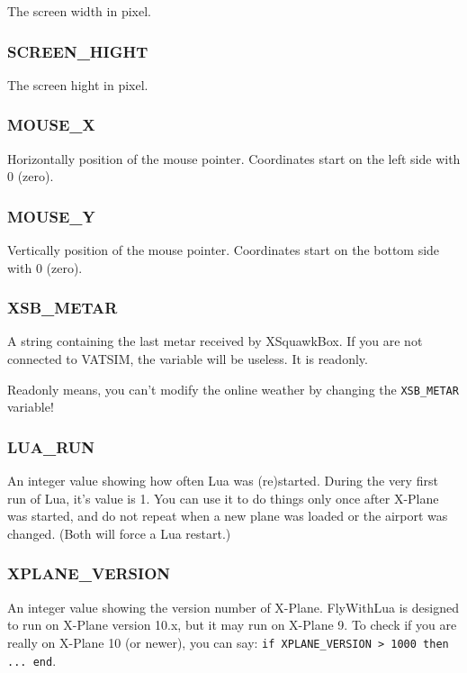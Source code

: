 \documentclass[11pt,parskip=half,a4paper]{scrartcl}
\begin{document}
The screen width in pixel.

\subsubsection{SCREEN\_HIGHT}

The screen hight in pixel.

\subsubsection{MOUSE\_X}

Horizontally position of the mouse pointer. Coordinates start on the left side with 0 (zero).

\subsubsection{MOUSE\_Y}

Vertically position of the mouse pointer. Coordinates start on the bottom side with 0 (zero).

\subsubsection{XSB\_METAR}

A string containing the last metar received by XSquawkBox. If you are not connected to VATSIM, the variable will be useless. It is readonly.

Readonly means, you can't modify the online weather by changing the \verb|XSB_METAR| variable!

\subsubsection{LUA\_RUN}

An integer value showing how often Lua was (re)started. During the very first run of Lua, it's value is 1. You can use it to do things only once after X-Plane was started, and do not repeat when a new plane was loaded or the airport was changed. (Both will force a Lua restart.)

\subsubsection{XPLANE\_VERSION}

An integer value showing the version number of X-Plane. FlyWithLua is designed to run on X-Plane version 10.x, but it may run on X-Plane 9. To check if you are really on X-Plane 10 (or newer), you can say: \verb|if XPLANE_VERSION > 1000 then ... end|.
\end{document}
